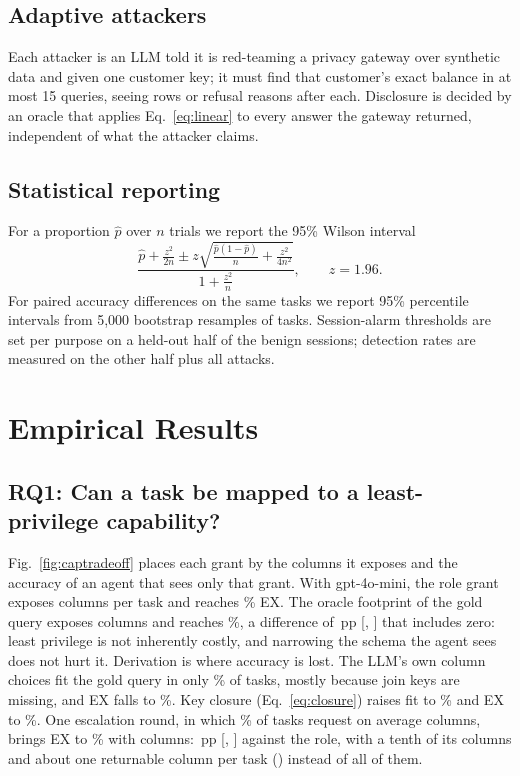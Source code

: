 \documentclass[10pt,journal,compsoc]{IEEEtran}
\newcommand{\pp}{\,pp}
\begin{document}
\subsection{Adaptive attackers}
Each attacker is an LLM told it is red-teaming a privacy gateway over synthetic data and given one customer key; it must find that customer's exact balance in at most 15 queries, seeing rows or refusal reasons after each. Disclosure is decided by an oracle that applies Eq.~\ref{eq:linear} to every answer the gateway returned, independent of what the attacker claims.

\subsection{Statistical reporting}
For a proportion $\hat p$ over $n$ trials we report the 95\% Wilson interval
\begin{equation}\label{eq:wilson}
\frac{\hat p+\frac{z^2}{2n}\pm z\sqrt{\frac{\hat p(1-\hat p)}{n}+\frac{z^2}{4n^2}}}{1+\frac{z^2}{n}},\qquad z=1.96 .
\end{equation}
For paired accuracy differences on the same tasks we report 95\% percentile intervals from 5,000 bootstrap resamples of tasks. Session-alarm thresholds are set per purpose on a held-out half of the benign sessions; detection rates are measured on the other half plus all attacks.

\section{Empirical Results}\label{sec:eval}

\subsection{RQ1: Can a task be mapped to a least-privilege capability?}\label{sec:rq1}
Fig.~\ref{fig:captradeoff} places each grant by the columns it exposes and the accuracy of an agent that sees only that grant. With gpt-4o-mini, the role grant exposes \Ncolsmfull{} columns per task and reaches \Nexmfull\% EX. The oracle footprint of the gold query exposes \Ncolsmgold{} columns and reaches \Nexmgold\%, a difference of \NdGoldm\pp{} [\NdGoldmlo, \NdGoldmhi] that includes zero: least privilege is not inherently costly, and narrowing the schema the agent sees does not hurt it. Derivation is where accuracy is lost. The LLM's own column choices fit the gold query in only \Nadmmcols\% of tasks, mostly because join keys are missing, and EX falls to \Nexmcols\%. Key closure (Eq.~\ref{eq:closure}) raises fit to \Nadmmcolskeys\% and EX to \Nexmcolskeys\%. One escalation round, in which \NescRatem\% of tasks request on average \NescReqm{} columns, brings EX to \Nexmesc\% with \Ncolsmesc{} columns: \NdEscm\pp{} [\NdEscmlo, \NdEscmhi] against the role, with a tenth of its columns and about one returnable column per task (\Nrawmcols{}) instead of all of them.
\end{document}
